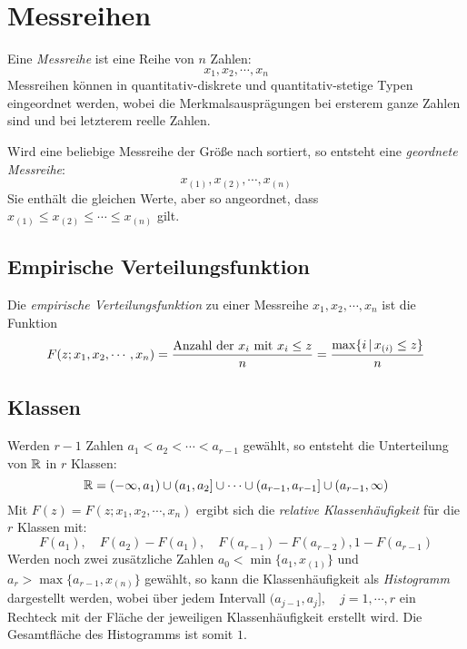     \section{Messreihen}
        Eine \textit{Messreihe} ist eine Reihe von \(n\) Zahlen:
        \begin{equation*}
            x_1, x_2, \cdots, x_n
        \end{equation*}
        Messreihen können in quantitativ-diskrete und quantitativ-stetige Typen eingeordnet werden, wobei die Merkmalsausprägungen bei ersterem ganze Zahlen sind und bei letzterem reelle Zahlen.
        
        Wird eine beliebige Messreihe der Größe nach sortiert, so entsteht eine \textit{geordnete Messreihe}:
        \begin{equation*}
            x_{(1)}, x_{(2)}, \cdots, x_{(n)}
        \end{equation*}
        Sie enthält die gleichen Werte, aber so angeordnet, dass \( x_{(1)} \leq x_{(2)} \leq \cdots \leq x_{(n)} \) gilt.

		\subsection{Empirische Verteilungsfunktion}
			Die \textit{empirische Verteilungsfunktion} zu einer Messreihe \( x_1, x_2, \cdots, x_n \) ist die Funktion
			\begin{equation*}
				F(z; x_1, x_2, \cdots, x_n) = \frac{\textrm{Anzahl der } x_i \textrm{ mit } x_i \leq z}{n} = \frac{\max \{ i \,\vert\, x_{(i)} \leq z \} }{n}
			\end{equation*}

        \subsection{Klassen}
            Werden \( r - 1 \) Zahlen \( a_1 < a_2 < \cdots < a_{r-1} \) gewählt, so entsteht die Unterteilung von \(\mathbb{R}\) in \(r\) Klassen:
            \begin{equation*}
	            \mathbb{R} = (-\infty, a_1) \cup (a_1, a_2] \cup \cdots \cup (a_{r-1}, a_{r-1}] \cup (a_{r-1}, \infty)
            \end{equation*}
            Mit \( F(z) = F(z; x_1, x_2, \cdots, x_n) \) ergibt sich die \textit{relative Klassenhäufigkeit} für die \(r\) Klassen mit:
            \begin{equation*}
	            F(a_1), \quad F(a_2) - F(a_1), \quad F(a_{r-1}) - F(a_{r-2}), 1 - F(a_{r-1})
            \end{equation*}
            Werden noch zwei zusätzliche Zahlen \( a_0 < \min \{ a_1, x_{(1)} \} \) und \( a_r > \max \{ a_{r-1}, x_{(n)} \} \) gewählt, so kann die Klassenhäufigkeit als \textit{Histogramm} dargestellt werden, wobei über jedem Intervall \( (a_{j-1}, a_j], \quad j = 1, \cdots, r \) ein Rechteck mit der Fläche der jeweiligen Klassenhäufigkeit erstellt wird. Die Gesamtfläche des Histogramms ist somit \(1\).

